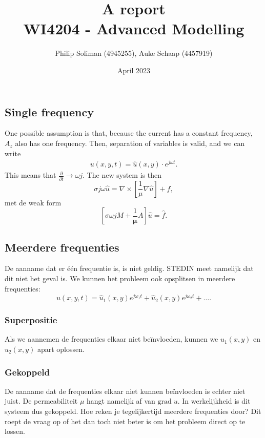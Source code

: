 \documentclass[11pt]{report}
\title{%
    A report \\
    \large WI4204 - Advanced Modelling
}
\author{Philip Soliman (4945255), Auke Schaap (4457919)}
\date{April 2023}
\begin{document}
\maketitle










\subsection{Single frequency}
One possible assumption is that, because the current has a constant frequency, $A_z$ also has one frequency. 
Then, separation of variables is valid, and we can write
\begin{align*}
    u(x,y,t) = \hat u(x,y) \cdot e^{j\omega t}.
\end{align*}
This means that $\frac{\partial}{\partial t} \to \omega j$. The new system is then
\begin{equation}
    \sigma j \omega \hat u = \nabla \times \left[\frac{1}{\mu}\nabla \hat u\right] + f,
\end{equation}
met de weak form
\begin{equation*}
    \left[\sigma \omega j M + \frac{1}{\mathbf \mu}A\right]\hat u = \hat f.
\end{equation*}

\subsection{Meerdere frequenties}
De aanname dat er één frequentie is, is niet geldig. STEDIN meet namelijk dat dit niet het geval is. We kunnen het probleem ook opsplitsen in meerdere frequenties:
\begin{equation}
    u(x,y,t) = \hat u_1(x,y) e^{j\omega_1 t} + \hat u_2(x,y) e^{j\omega_2 t} + \dots.
\end{equation}

\subsubsection{Superpositie}
Als we aannemen de frequenties elkaar niet beïnvloeden, kunnen we $\hat u_1(x,y)$ en $\hat u_2(x,y)$ apart oplossen.

\subsubsection{Gekoppeld}
De aanname dat de frequenties elkaar niet kunnen beïnvloeden is echter niet juist. De permeabiliteit $\mu$ hangt namelijk af van $\text{grad} \; u$. In werkelijkheid is dit systeem dus gekoppeld. Hoe reken je tegelijkertijd meerdere frequenties door? Dit roept de vraag op of het dan toch niet beter is om het probleem direct op te lossen.
\end{document}
